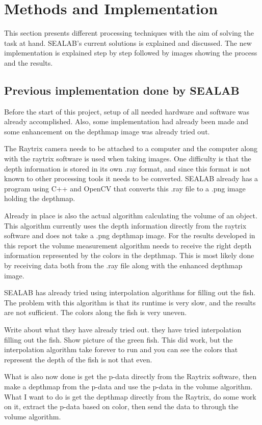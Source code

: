 \section{Methods and Implementation}\label{methods and implementation}

This section presents different processing techniques with the aim of solving the task at hand. SEALAB's current solutions is explained and discussed. The new implementation is explained step by step followed by images showing the process and the results.


\subsection{Previous implementation done by SEALAB}

Before the start of this project, setup of all needed hardware and software was already accomplished. Also, some implementation had already been made and some enhancement on the depthmap image was already tried out.

The Raytrix camera needs to be attached to a computer and the computer along with the raytrix software is used when taking images. One difficulty is that the depth information is stored in its own .ray format, and since this format is not known to other processing tools it needs to be converted. SEALAB already has a program using C++ and OpenCV that converts this .ray file to a .png image holding the depthmap. 

Already in place is also the actual algorithm calculating the volume of an object. This algorithm currently uses the depth information directly from the raytrix software and does not take a .png depthmap image. For the results developed in this report the volume measurement algorithm needs to receive the right depth information represented by the colors in the depthmap. This is most likely done by receiving data both from the .ray file along with the enhanced depthmap image.

SEALAB has already tried using interpolation algorithms for filling out the fish. The problem with this algorithm is that its runtime is very slow, and the results are not sufficient. The colors along the fish is very uneven. 


{\color{red}
Write about what they have already tried out. 
they have tried interpolation filling out the fish. Show picture of the green fish. 
This did work, but the interpolation algorithm take forever to run and you can see the colors that represent the depth of the fish is not that even.

What is also now done is get the p-data directly from the Raytrix software, then make a depthmap from the p-data and use the p-data in the volume algorithm. What I want to do is get the depthmap directly from the Raytrix, do some work on it, extract the p-data based on color, then send the data to through the volume algorithm. 
}

